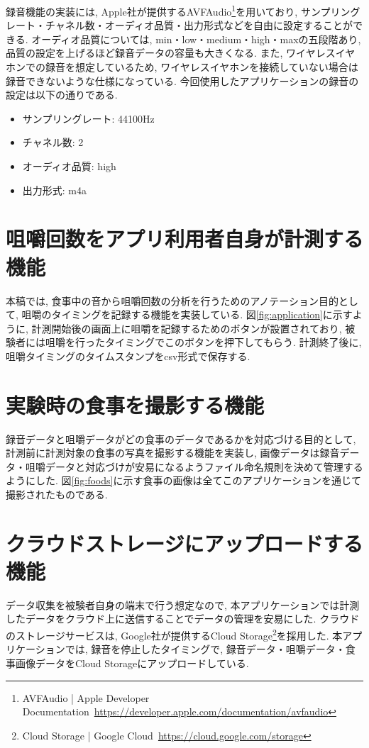 録音機能の実装には, Apple社が提供するAVFAudio\footnote{AVFAudio | Apple Developer Documentation~\url{https://developer.apple.com/documentation/avfaudio}}を用いており, サンプリングレート・チャネル数・オーディオ品質・出力形式などを自由に設定することができる. オーディオ品質については, min・low・medium・high・maxの五段階あり, 品質の設定を上げるほど録音データの容量も大きくなる. また, ワイヤレスイヤホンでの録音を想定しているため, ワイヤレスイヤホンを接続していない場合は録音できないような仕様になっている. 今回使用したアプリケーションの録音の設定は以下の通りである.

\begin{itemize}
    \item サンプリングレート: 44100Hz
    \item チャネル数: 2
    \item オーディオ品質: high
    \item 出力形式: m4a
\end{itemize}

\section{咀嚼回数をアプリ利用者自身が計測する機能}

本稿では, 食事中の音から咀嚼回数の分析を行うためのアノテーション目的として, 咀嚼のタイミングを記録する機能を実装している. 図\ref{fig:application}に示すように, 計測開始後の画面上に咀嚼を記録するためのボタンが設置されており, 被験者には咀嚼を行ったタイミングでこのボタンを押下してもらう. 計測終了後に, 咀嚼タイミングのタイムスタンプをcsv形式で保存する.

\section{実験時の食事を撮影する機能}

録音データと咀嚼データがどの食事のデータであるかを対応づける目的として, 計測前に計測対象の食事の写真を撮影する機能を実装し, 画像データは録音データ・咀嚼データと対応づけが安易になるようファイル命名規則を決めて管理するようにした. 図\ref{fig:foods}に示す食事の画像は全てこのアプリケーションを通じて撮影されたものである.

\section{クラウドストレージにアップロードする機能}

データ収集を被験者自身の端末で行う想定なので, 本アプリケーションでは計測したデータをクラウド上に送信することでデータの管理を安易にした. クラウドのストレージサービスは, Google社が提供するCloud Storage\footnote{Cloud Storage | Google Cloud~\url{https://cloud.google.com/storage}}を採用した. 本アプリケーションでは, 録音を停止したタイミングで, 録音データ・咀嚼データ・食事画像データをCloud Storageにアップロードしている.

